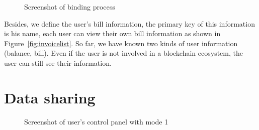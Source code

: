 \begin{figure}[htb]
    \centering
    \caption{{\footnotesize Screenshot of binding process}}
    \label{fig:bind}
\end{figure}
Besides, we define the user's bill information, the primary key of this information is his name, each user can view their own bill information as shown in Figure~\ref{fig:invoicelist}. So far, we have known two kinds of user information (balance, bill). Even if the user is not involved in a blockchain ecosystem, the user can still see their information.

\clearpage
\newpage

\section{Data sharing}

\begin{figure}[htb]
    \centering
    \caption{{\footnotesize Screenshot of user's control panel with mode 1}}
    \label{fig:mode1}
\end{figure}

